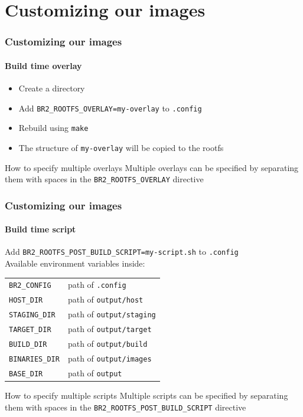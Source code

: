 \section{Customizing our images}
\begin{frame}
  \frametitle{\hypertarget{customizing our images}{Customizing our images}}
  \framesubtitle{Build time overlay}
  \begin{itemize}
    \item Create a directory
    \item Add \texttt{BR2\_ROOTFS\_OVERLAY=my-overlay} to \texttt{.config}
    \item Rebuild using \texttt{make}
    \item The structure of \texttt{my-overlay} will be copied to the rootfs
  \end{itemize}
  \begin{block}{How to specify multiple overlays}
    Multiple overlays can be specified by separating them with spaces in the \texttt{BR2\_ROOTFS\_OVERLAY} directive
  \end{block}
\end{frame}
\begin{frame}
  \frametitle{Customizing our images}
  \framesubtitle{Build time script}
  Add \texttt{BR2\_ROOTFS\_POST\_BUILD\_SCRIPT=my-script.sh} to \texttt{.config} \\
  Available environment variables inside:
  \begin{table}
    \begin{center}
      \begin{tabular}{ll}
        \texttt{BR2\_CONFIG} & path of \texttt{.config} \\
        \texttt{HOST\_DIR} & path of \texttt{output/host} \\
        \texttt{STAGING\_DIR} & path of \texttt{output/staging} \\
        \texttt{TARGET\_DIR} & path of \texttt{output/target} \\
        \texttt{BUILD\_DIR} & path of \texttt{output/build} \\
        \texttt{BINARIES\_DIR} & path of \texttt{output/images} \\
        \texttt{BASE\_DIR} & path of \texttt{output} \\
      \end{tabular}
    \end{center}
  \end{table}
  \begin{block}{How to specify multiple scripts}
    Multiple scripts can be specified by separating them with spaces in the \texttt{BR2\_ROOTFS\_POST\_BUILD\_SCRIPT} directive
  \end{block}
\end{frame}
